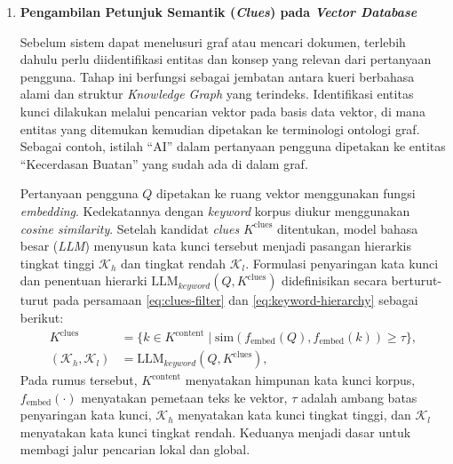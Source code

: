 \begin{enumerate}[label=\textbf{\arabic*.}, leftmargin=*, itemsep=10pt, listparindent=0.75cm]
          \begin{enumerate}[label=\textbf{\alph*.}, leftmargin=*, itemsep=5pt, listparindent=0.75cm]

              \item \textbf{Pengambilan Petunjuk Semantik (\textit{Clues}) pada \textit{Vector Database}}

                    Sebelum sistem dapat menelusuri graf atau mencari dokumen, terlebih dahulu perlu diidentifikasi entitas dan konsep yang relevan dari pertanyaan pengguna. Tahap ini berfungsi sebagai jembatan antara kueri berbahasa alami dan struktur \textit{Knowledge Graph} yang terindeks. Identifikasi entitas kunci dilakukan melalui pencarian vektor pada basis data vektor, di mana entitas yang ditemukan kemudian dipetakan ke terminologi ontologi graf. Sebagai contoh, istilah ``AI'' dalam pertanyaan pengguna dipetakan ke entitas ``Kecerdasan Buatan'' yang sudah ada di dalam graf.

                    Pertanyaan pengguna $Q$ dipetakan ke ruang vektor menggunakan fungsi \textit{embedding}. Kedekatannya dengan \textit{keyword} korpus diukur menggunakan \textit{cosine similarity}. Setelah kandidat \textit{clues} $K^{\text{clues}}$ ditentukan, model bahasa besar (\textit{LLM}) menyusun kata kunci tersebut menjadi pasangan hierarkis tingkat tinggi $\mathcal{K}_h$ dan tingkat rendah $\mathcal{K}_l$. Formulasi penyaringan kata kunci dan penentuan hierarki $\text{LLM}_{keyword}(Q, K^{\text{clues}})$ \citep{chen2025acadrag} didefinisikan secara berturut-turut pada persamaan \eqref{eq:clues-filter} dan \eqref{eq:keyword-hierarchy} sebagai berikut:
                    \begin{align}
                        K^{\text{clues}}               & = \{k \in K^{\text{content}} \mid \text{sim}(f_{\text{embed}}(Q), f_{\text{embed}}(k)) \geq \tau\}, \label{eq:clues-filter} \\
                        (\mathcal{K}_h, \mathcal{K}_l) & = \text{LLM}_{keyword}(Q, K^{\text{clues}}), \label{eq:keyword-hierarchy}
                    \end{align}
                    Pada rumus tersebut, $K^{\text{content}}$ menyatakan himpunan kata kunci korpus, $f_{\text{embed}}(\cdot)$ menyatakan pemetaan teks ke vektor, $\tau$ adalah ambang batas penyaringan kata kunci, $\mathcal{K}_h$ menyatakan kata kunci tingkat tinggi, dan $\mathcal{K}_l$ menyatakan kata kunci tingkat rendah. Keduanya menjadi dasar untuk membagi jalur pencarian lokal dan global.


\end{enumerate}
\end{enumerate}
